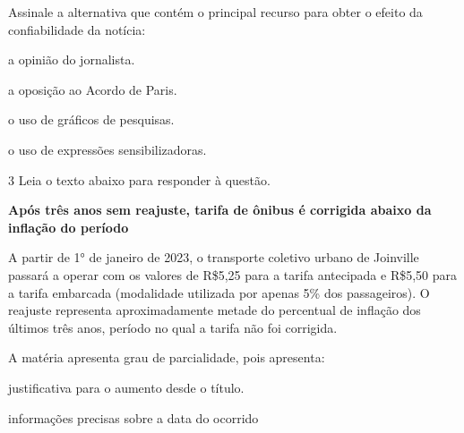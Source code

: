 {

Assinale a alternativa que contém o principal recurso para obter o efeito da 
confiabilidade da notícia:

\begin{escolha}

  \item a opinião do jornalista.
  
  \item a oposição ao Acordo de Paris.
  
  \item o uso de gráficos de pesquisas.
  
  \item o uso de expressões sensibilizadoras.

\end{escolha}

\num{3} Leia o texto abaixo para responder à questão.

\begin{myquote}

\textbf{Após três anos sem reajuste, tarifa de ônibus é corrigida abaixo da
inflação do período}

A partir de 1° de janeiro de 2023, o transporte coletivo urbano de
Joinville passará a operar com os valores de R\$5,25 para a tarifa
antecipada e R\$5,50 para a tarifa embarcada (modalidade utilizada por
apenas 5\% dos passageiros). O reajuste representa aproximadamente
metade do percentual de inflação dos últimos três anos, período no qual
a tarifa não foi corrigida.

\end{myquote}


A matéria apresenta grau de parcialidade, pois apresenta:

\begin{escolha}
  
  \item justificativa para o aumento desde o título.
  
  \item informações precisas sobre a data do ocorrido
  

\end{escolha}}

